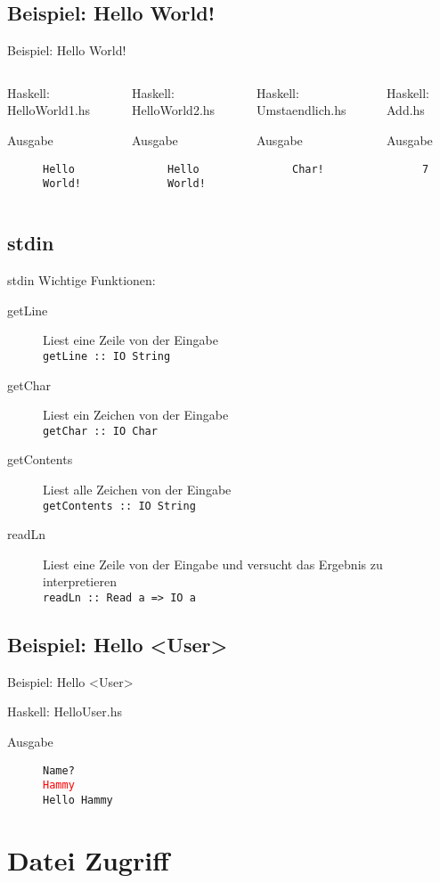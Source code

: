 \documentclass{beamer}
\newcommand{\outputcode}[3]
{
	\begin{block}{#1: #2}
	
	\begin{description}
	\item[Ausgabe]\texttt{#3}
	\end{description}
	\end{block}
}
\begin{document}
\subsection{Beispiel: Hello World!}
\begin{frame}[<+->][fragile]{Beispiel: Hello World!}
\tiny
\begin{columns}
\outputcode{Haskell}{HelloWorld1.hs}{Hello \\ World!}
\outputcode{Haskell}{HelloWorld2.hs}{Hello World!}
\outputcode{Haskell}{Umstaendlich.hs}{Char!}
\outputcode{Haskell}{Add.hs}{7}
\end{columns}
\end{frame}

\subsection{stdin}
\begin{frame}[<+->]{stdin}
Wichtige Funktionen:
\begin{description}
\item[getLine] Liest eine Zeile von der Eingabe \\ \texttt{getLine :: IO String}
\item[getChar] Liest ein Zeichen von der Eingabe \\ \texttt{getChar :: IO Char}
\item[getContents] Liest alle Zeichen von der Eingabe \\ \texttt{getContents :: IO String}
\item[readLn] Liest eine Zeile von der Eingabe und versucht das Ergebnis zu interpretieren \\ \texttt{readLn :: Read a => IO a}
\end{description}
\end{frame}


\subsection{Beispiel: Hello <User>}
\begin{frame}[<+->][fragile]{Beispiel: Hello <User>}
\outputcode{Haskell}{HelloUser.hs}{Name?\\ \textcolor{red}{Hammy}\\Hello Hammy}
\end{frame}

\section{Datei Zugriff}
\end{document}
